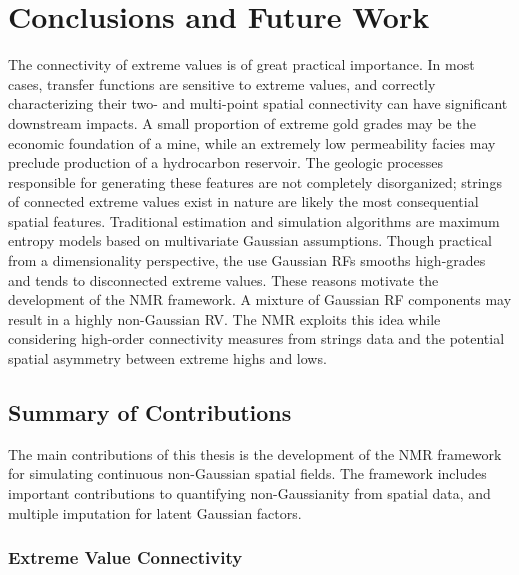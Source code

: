 
\chapter{Conclusions and Future Work}
\label{ch:07conclusions}

The connectivity of extreme values is of great practical importance. In most cases, transfer functions are sensitive to extreme values, and correctly characterizing their two- and multi-point spatial connectivity can have significant downstream impacts. A small proportion of extreme gold grades may be the economic foundation of a mine, while an extremely low permeability facies may preclude production of a hydrocarbon reservoir. The geologic processes responsible for generating these features are not completely disorganized; strings of connected extreme values exist in nature are likely the most consequential spatial features. Traditional estimation and simulation algorithms are maximum entropy models based on multivariate Gaussian assumptions. Though practical from a dimensionality perspective, the use Gaussian \glspl{RF} smooths high-grades and tends to disconnected extreme values. These reasons motivate the development of the \gls{NMR} framework. A mixture of Gaussian \gls{RF} components may result in a highly non-Gaussian \gls{RV}. The \gls{NMR} exploits this idea while considering high-order connectivity measures from strings data and the potential spatial asymmetry between extreme highs and lows.


\FloatBarrier
\section{Summary of Contributions}
\label{sec:07contrib}

The main contributions of this thesis is the development of the \gls{NMR} framework for simulating continuous non-Gaussian spatial fields. The framework includes important contributions to quantifying non-Gaussianity from spatial data, and multiple imputation for latent Gaussian factors.

\subsection{Extreme Value Connectivity}
\label{subsec:07connect}

